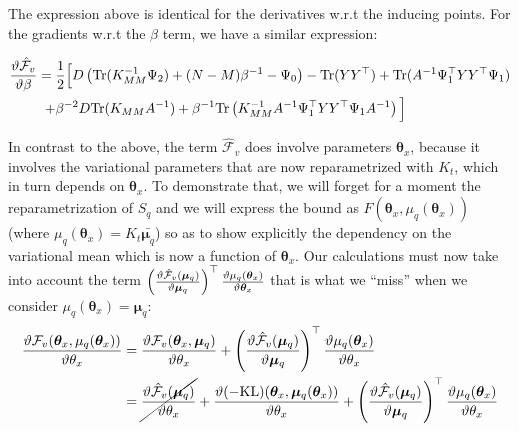The expression above is identical for the derivatives w.r.t the inducing points.
For the gradients w.r.t the $\beta$ term, we have a similar expression:



\begin{align}
\frac{\vartheta \hat{\mathcal{F}}_v}{\vartheta \beta} ={}&
  \frac{1}{2} \Big[ 
      D \left( \text{Tr}(K_{MM}^{-1} \Psi_2) + (N-M)\beta^{-1} - \Psi_0 \right) - \text{Tr}(Y Y^{\top})
	  + \text{Tr}(A^{-1}\Psi_1^{\top} Y Y^{\top} \Psi_1) \nonumber \\
   +{}& \beta^{-2} D \text{Tr} ( K_{MM} A^{-1} ) + \beta^{-1} \text{Tr} \left( K_{MM}^{-1} A^{-1} \Psi_1^{\top} Y Y^{\top} \Psi_1 A^{-1} \right) \Big]
\label{derivb2}
\end{align}


In contrast to the above, the term $\hat{\mathcal{F}}_v$ does involve parameters $\boldsymbol \theta_x$, because it involves the variational parameters that are now reparametrized with $K_t$, which in turn depends on $\boldsymbol \theta_x$. 
To demonstrate that, we will forget for a moment the reparametrization of $S_q$ and we will express the bound as $F(\boldsymbol \theta_x, \mu_q (\boldsymbol \theta_x))$ (where $\mu_q (\boldsymbol \theta_x) = K_t \bar{\boldsymbol \mu_q}$) so as to show explicitly the dependency on the variational mean which is now a function of $\boldsymbol \theta_x$. Our calculations must now take into account the term
$
\left( \frac{\vartheta \hat{\mathcal{F}}_v(\boldsymbol \mu_q)}{\vartheta \boldsymbol \mu_q} \right)^{\top}
       \frac{\vartheta \mu_q (\boldsymbol \theta_x)}{\vartheta \boldsymbol \theta_x}
$
that is what we ``miss'' when we consider $\mu_q(\boldsymbol \theta_x) = \boldsymbol \mu_q$:
\begin{align}
\frac{\vartheta \mathcal{F}_v(\boldsymbol \theta_x, \mu_q(\boldsymbol \theta_x))}{\vartheta \theta_x} = {}&
	\frac{\vartheta \mathcal{F}_v(\boldsymbol \theta_x, \boldsymbol \mu_q)}{\vartheta \theta_x} 
  +  \left( \frac{\vartheta \hat{\mathcal{F}}_v(\boldsymbol \mu_q)}{\vartheta \boldsymbol \mu_q} \right)^{\top}
            \frac{\vartheta \mu_q(\boldsymbol \theta_x)}{\vartheta \theta_x} \nonumber \\
= {}&
 \cancel{
    \frac{\vartheta \hat{\mathcal{F}}_v(\boldsymbol \mu_q)}{\vartheta \theta_x}
  } +
  \frac{\vartheta (-\text{KL})(\boldsymbol \theta_x, \boldsymbol \mu_q(\boldsymbol \theta_x))}{\vartheta \theta_x}
+  \left( \frac{\vartheta \hat{\mathcal{F}}_v(\boldsymbol \mu_q)}{\vartheta \boldsymbol \mu_q} \right)^{\top}
            \frac{\vartheta \mu_q(\boldsymbol \theta_x)}{\vartheta \theta_x}
\label{meanReparamDerivFTheta}
\end{align}


